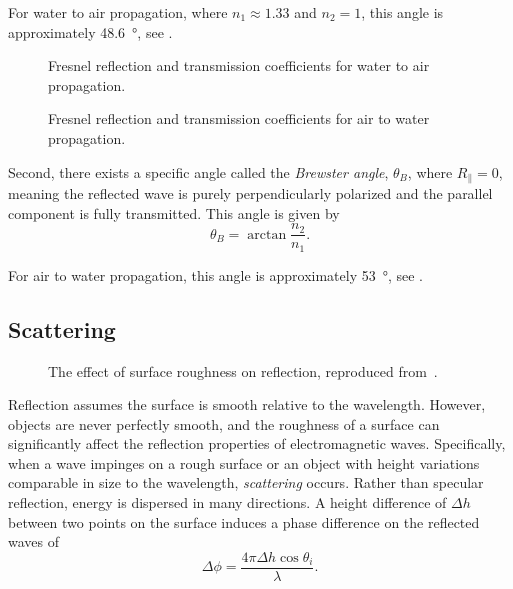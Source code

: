 For water to air propagation, where $n_1 \approx 1.33$ and $n_2 = 1$, this angle is approximately \qty{48.6}{\degree}, see .

\begin{figure}
  \centering
  \caption{Fresnel reflection and transmission coefficients for water to air propagation.}
\end{figure}

\begin{figure}
  \centering
  \caption{Fresnel reflection and transmission coefficients for air to water propagation.}
\end{figure}

Second, there exists a specific angle called the \emph{Brewster angle}, $\theta_B$, where $R_{\parallel} = 0$, meaning the reflected wave is purely perpendicularly polarized and the parallel component is fully transmitted. This angle is given by
\begin{equation}
  \theta_B = \arctan\frac{n_2}{n_1}.
\end{equation}

For air to water propagation, this angle is approximately \qty{53}{\degree}, see .

\subsection{Scattering}

\begin{figure}
  \centering
  \caption{The effect of surface roughness on reflection, reproduced from~\cite[Fig.~3.6]{Saunders2024}.}
\end{figure}

Reflection assumes the surface is smooth relative to the \gls{wavelength}. However, objects are never perfectly smooth, and the roughness of a surface can significantly affect the reflection properties of electromagnetic waves. Specifically, when a wave impinges on a rough surface or an object with height variations comparable in size to the \gls{wavelength}, \emph{scattering} occurs. Rather than specular reflection, energy is dispersed in many directions. A height difference of $\Delta h$ between two points on the surface induces a phase difference on the reflected waves of
\begin{equation}
  \Delta \phi = \frac{4 \pi \Delta h \cos\theta_i}{\lambda}.
\end{equation}

